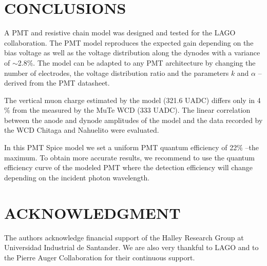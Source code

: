 \documentclass[letterpaper, 10 pt, conference]{ieeeconf}  %
\begin{document}
\section{CONCLUSIONS}

A PMT and resistive chain model was designed and tested for the LAGO collaboration. The PMT model reproduces the expected gain depending on the bias voltage as well as the voltage distribution along the dynodes with a variance of $\sim$2.8$\%$. The model can be adapted to any PMT architecture by changing the number of electrodes, the voltage distribution ratio and the parameters $k$ and $\alpha$ -- derived from the PMT datasheet.

The vertical muon charge estimated by the model (321.6 UADC) differs only in 4$\%$ from the measured by the MuTe WCD (333 UADC). The linear correlation between the anode and dynode amplitudes of the model and the data recorded by the WCD Chitaga and Nahuelito were evaluated. 

In this PMT Spice model we set a uniform PMT quantum efficiency of 22$\%$ --the maximum. To obtain more accurate results, we recommend to use the quantum efficiency curve of the modeled PMT where the detection efficiency will change depending on the incident photon wavelength.

\addtolength{\textheight}{-12cm}   %





\section*{ACKNOWLEDGMENT}

The authors acknowledge  financial support of the Halley Research Group at Universidad Industrial de Santander. We are also very thankful to LAGO and to the Pierre Auger Collaboration for their continuous support.



\end{document}

